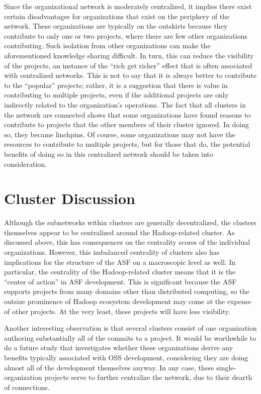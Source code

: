 Since the organizational network is moderately centralized, it implies there exist certain disadvantages for organizations that exist on the periphery of the network. These organizations are typically on the outskirts because they contribute to only one or two projects, where there are few other organizations contributing. Such isolation from other organizations can make the aforementioned knowledge sharing difficult. In turn, this can reduce the visibility of the projects, an instance of the ``rich get richer'' effect that is often associated with centralized networks. This is not to say that it is always better to contribute to the ``popular'' projects; rather, it is a suggestion that there is value in contributing to multiple projects, even if the additional projects are only indirectly related to the organization's operations. The fact that all clusters in the network are connected shows that some organizations have found reasons to contribute to projects that the other members of their cluster ignored. In doing so, they became linchpins. Of course, some organizations may not have the resources to contribute to multiple projects, but for those that do, the potential benefits of doing so in this centralized network should be taken into consideration.

\section{Cluster Discussion}
Although the subnetworks within clusters are generally decentralized, the clusters themselves appear to be centralized around the Hadoop-related cluster. As discussed above, this has consequences on the centrality scores of the individual organizations. However, this imbalanced centrality of clusters also has implications for the structure of the ASF on a macroscopic level as well. In particular, the centrality of the Hadoop-related cluster means that it is the ``center of action'' in ASF development. This is significant because the ASF supports projects from many domains other than distributed computing, so the outsize prominence of Hadoop ecosystem development may come at the expense of other projects. At the very least, these projects will have less visibility.

Another interesting observation is that several clusters consist of one organization authoring substantially all of the commits to a project. It would be worthwhile to do a future study that investigates whether these organizations derive any benefits typically associated with OSS development, considering they are doing almost all of the development themselves anyway. In any case, these single-organization projects serve to further centralize the network, due to their dearth of connections.